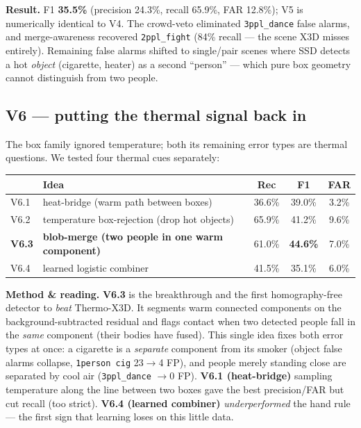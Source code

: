 \documentclass[11pt, a4paper]{article}
\begin{document}
\textbf{Result.} F1 \textbf{35.5\%} (precision 24.3\%, recall 65.9\%, FAR 12.8\%);
V5 is numerically identical to V4. The crowd-veto eliminated \texttt{3ppl\_dance}
false alarms, and merge-awareness recovered \texttt{2ppl\_fight} (84\% recall ---
the scene X3D misses entirely). Remaining false alarms shifted to single/pair
scenes where SSD detects a hot \emph{object} (cigarette, heater) as a second
``person'' --- which pure box geometry cannot distinguish from two people.

\subsection{V6 --- putting the thermal signal back in}
\label{sec:v6}
The box family ignored temperature; both its remaining error types are thermal
questions. We tested four thermal cues separately:

\begin{center}\renewcommand{\arraystretch}{1.15}
\begin{tabular}{l l c c c}
\toprule
& \textbf{Idea} & \textbf{Rec} & \textbf{F1} & \textbf{FAR} \\
\midrule
V6.1 & heat-bridge (warm path between boxes)        & 36.6\% & 39.0\% & 3.2\% \\
V6.2 & temperature box-rejection (drop hot objects) & 65.9\% & 41.2\% & 9.6\% \\
\rowcolor{rowhi}\textbf{V6.3} & \textbf{blob-merge (two people in one warm component)} & 61.0\% & \textbf{44.6\%} & 7.0\% \\
V6.4 & learned logistic combiner                    & 41.5\% & 35.1\% & 6.0\% \\
\bottomrule
\end{tabular}\end{center}

\textbf{Method \& reading.} \textbf{V6.3} is the breakthrough and the first
homography-free detector to \emph{beat} Thermo-X3D. It segments warm connected
components on the background-subtracted residual and flags contact when two
detected people fall in the \emph{same} component (their bodies have fused). This
single idea fixes both error types at once: a cigarette is a \emph{separate}
component from its smoker (object false alarms collapse, \texttt{1person~cig}
23$\to$4 FP), and people merely standing close are separated by cool air
(\texttt{3ppl\_dance} $\to$0 FP). \textbf{V6.1 (heat-bridge)} sampling temperature
along the line between two boxes gave the best precision/FAR but cut recall (too
strict). \textbf{V6.4 (learned combiner)} \emph{underperformed} the hand rule ---
the first sign that learning loses on this little data.
\end{document}
